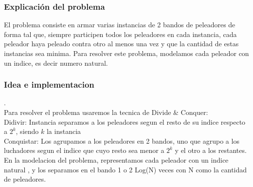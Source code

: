\subsubsection{Explicación del problema}
El problema consiste en armar varias instancias de 2 bandos de peleadores de forma tal que, siempre participen todos los peleadores en cada instancia, cada peleador haya peleado contra otro al menos una vez y que la cantidad de estas instancias sea minima.
Para resolver este problema, modelamos cada peleador con un indice, es decir numero natural.

\subsubsection{Idea e implementacion}
.\\
Para resolver el problema usaremos la tecnica de Divide \& Conquer: \\
	Didivir: Instancia separamos a los peleadores segun el resto de su indice respecto a $2^k$, siendo $k$ la instancia \\
	Conquistar: Los agrupamos a los peleadores en 2 bandos, uno que agrupo a los luchadores segun el indice que cuyo resto sea menor a $2^k$ y el otro a los restantes. \\

 En la modelacion del problema, representamos cada peleador con un indice natural , y los separamos en el bando 1 o 2 Log(N) veces con N como la cantidad de peleadores.


